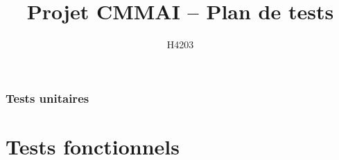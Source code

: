\documentclass[11pt, a4paper]{article}
\title{Projet CMMAI -- Plan de tests}
\author{H4203}
\date{}
\begin{document}
\maketitle
\tableofcontents

\section{Tests unitaires}




\newpage
\part{Tests fonctionnels}
\setcounter{testno}{0}





\end{document}
